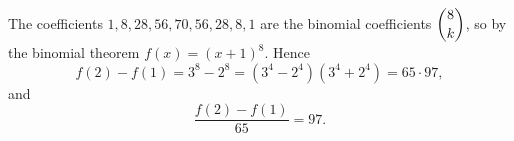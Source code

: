 The coefficients $1,8,28,56,70,56,28,8,1$ are the binomial coefficients $\dbinom8k$, so by the binomial theorem $f(x)=(x+1)^8$. Hence
\[f(2)-f(1)=3^8-2^8=\left(3^4-2^4\right)\left(3^4+2^4\right)=65\cdot97,\]
and
\[\dfrac{f(2)-f(1)}{65}=\boxed{97}.\]
